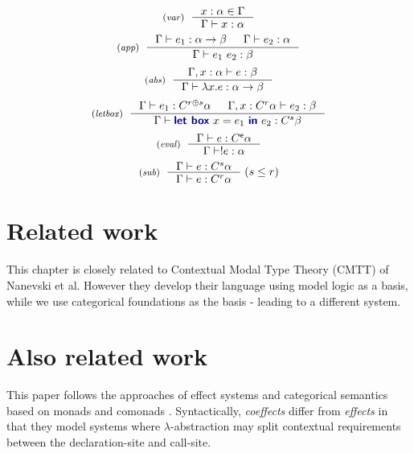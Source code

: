 \begin{equation*}
\tyrule{var}
  {x : \alpha \in \Gamma}
  {\Gamma \vdash x : \alpha }
\end{equation*}
\begin{equation*}
\tyrule{app}
  {\Gamma \vdash e_1 : \alpha \rightarrow \beta &
   \Gamma \vdash e_2 : \alpha }
  {\Gamma \vdash e_1~e_2 : \beta}
\end{equation*}
\begin{equation*}
\tyrule{abs}
  {\Gamma, x:\alpha \vdash e : \beta}
  {\Gamma \vdash \lambda x.e : \alpha \rightarrow \beta }
\end{equation*}
\begin{equation*}
\tyrule{letbox}
  {\Gamma \vdash e_1 : \ctyp{r \mseq s}{\alpha} & \Gamma, x : \ctyp{r}{\alpha} \vdash e_2 : \beta }
  {\Gamma \vdash \kvd{let~box}~x=e_1~\kvd{in}~e_2 : \ctyp{s}{\beta}}
\end{equation*}
\begin{equation*}
\tyrule{eval}
  {\Gamma \vdash e : \ctyp{\munit}{\alpha}}
  {\Gamma \vdash !e : \alpha}
\end{equation*}
\begin{equation*}
\tyrule{sub}
  {\Gamma \vdash e : \ctyp{s}{\alpha} }
  {\Gamma \vdash e : \ctyp{r}{\alpha} }
\;(s\leq r)  
\end{equation*}



\section{Related work}
This chapter is closely related to Contextual Modal Type Theory (CMTT) of Nanevski et al. However
they develop their language using model logic as a basis, while we use categorical foundations 
as the basis - leading to a different system.

\section{Also related work}

This paper follows the approaches of effect systems \cite{effects-gifford,effects-talpin-et-al,monads-effects-marriage}
and categorical semantics based on monads and comonads \cite{monad-notions,comonads-notions}. Syntactically,
\emph{coeffects} differ from \emph{effects} in that they model systems where $\lambda$-abstraction 
may split contextual requirements between the declaration-site and call-site.

